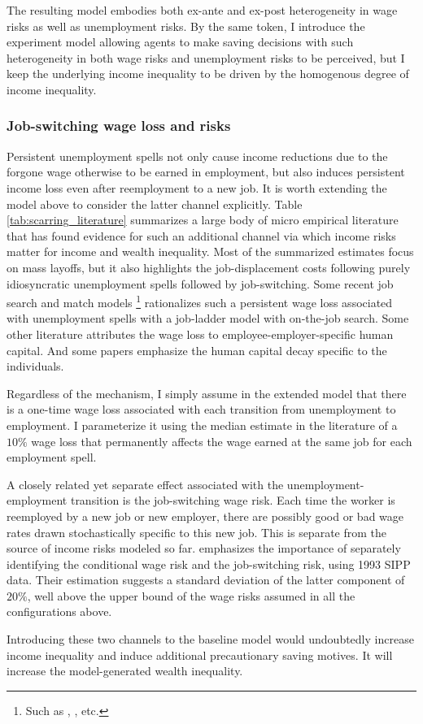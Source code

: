 The resulting model embodies both ex-ante and ex-post heterogeneity in wage risks as well as unemployment risks. By the same token, I introduce the experiment model allowing agents to make saving decisions with such heterogeneity in both wage risks and unemployment risks to be perceived, but I keep the underlying income inequality to be driven by the homogenous degree of income inequality. 

\subsubsection{Job-switching wage loss and risks}

Persistent unemployment spells not only cause income reductions due to the forgone wage otherwise to be earned in employment, but also induces persistent income loss even after reemployment to a new job. It is worth extending the model above to consider the latter channel explicitly. Table \ref{tab:scarring_literature} summarizes a large body of micro empirical literature that has found evidence for such an additional channel via which income risks matter for income and wealth inequality. Most of the summarized estimates focus on mass layoffs, but it also highlights the job-displacement costs following purely idiosyncratic unemployment spells followed by job-switching. Some recent job search and match models \footnote{Such as \cite{low2010wage}, \cite{lachowska2020sources}, etc.} rationalizes such a persistent wage loss associated with unemployment spells with a job-ladder model with on-the-job search. Some other literature attributes the wage loss to employee-employer-specific human capital. And some papers emphasize the human capital decay specific to the individuals. 

Regardless of the mechanism, I simply assume in the extended model that there is a one-time wage loss associated with each transition from unemployment to employment. I parameterize it using the median estimate in the literature of a $10\%$ wage loss that permanently affects the wage earned at the same job for each employment spell. 

A closely related yet separate effect associated with the unemployment-employment transition is the job-switching wage risk. Each time the worker is reemployed by a new job or new employer, there are possibly good or bad wage rates drawn stochastically specific to this new job. This is separate from the source of income risks modeled so far.  \cite{low2010wage} emphasizes the importance of separately identifying the conditional wage risk and the job-switching risk, using 1993 SIPP data. Their estimation suggests a standard deviation of the latter component of $20\%$, well above the upper bound of the wage risks assumed in all the configurations above. 

Introducing these two channels to the baseline model would undoubtedly increase income inequality and induce additional precautionary saving motives. It will increase the model-generated wealth inequality.  